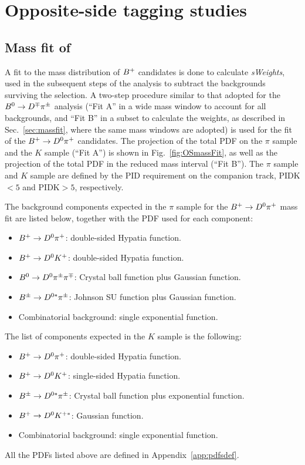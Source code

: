 \section{Opposite-side tagging studies}
\label{app:OS}

\subsection[Mass fit of $\Bp\to\Dz\pip$]{Mass fit of \boldmath{$\Bp\to\Dz\pip$}}
\label{app:OSmassFit}

A fit to the mass distribution of $B^+$ candidates is done to calculate \emph{sWeights},
used in the subsequent steps of the analysis to subtract the backgrounds surviving the selection.
A two-step procedure similar to that adopted for the $B^0\rightarrow D^\mp\pi^\pm$ analysis (``Fit A'' in a
wide mass window to account for all backgrounds, and ``Fit B'' in a subset to calculate the weights,
as described in Sec.~\ref{sec:massfit}, where the same mass windows are adopted) is used for the fit of the $\Bp\to\Dz\pip$ candidates.
The projection of the total PDF on the $\pi$ sample and the $K$ sample (``Fit A'') is shown in
Fig.~\ref{fig:OSmassFit}, as well as the projection of the total PDF in the reduced mass interval (``Fit B'').
The $\pi$ sample and $K$ sample are defined by the PID requirement
on the companion track, PIDK$<5$ and PIDK$>5$, respectively.

The background components expected in the $\pi$ sample for the $\Bp\to\Dz\pip$ mass fit are listed below,
together with the PDF used for each component:
\begin{itemize}[noitemsep,topsep=0pt]
  \item $\Bp\to\Dz\pip$: double-sided Hypatia function.
  \item $B^+\rightarrow D^0K^+$: double-sided Hypatia function.
  \item $B^0\rightarrow D^0\pi^\pm\pi^\mp$: Crystal ball function plus Gaussian function.
  \item $B^\pm\rightarrow D^{0*}\pi^\pm$: Johnson SU function plus Gaussian function.
  \item Combinatorial background: single exponential function.  
\end{itemize}
The list of components expected in the $K$ sample is the following:
\begin{itemize}[noitemsep,topsep=0pt]
  \item $\Bp\to\Dz\pip$: double-sided Hypatia function.
  \item $B^+\rightarrow D^0K^+$: single-sided Hypatia function.
  \item $B^\pm\rightarrow D^{0*}\pi^\pm$: Crystal ball function plus exponential function.
  \item $B^+\rightarrow D^0 K^{+*}$: Gaussian function.
  \item Combinatorial background: single exponential function.  
\end{itemize}
All the PDFs listed above are defined in Appendix~\ref{app:pdfsdef}. 

